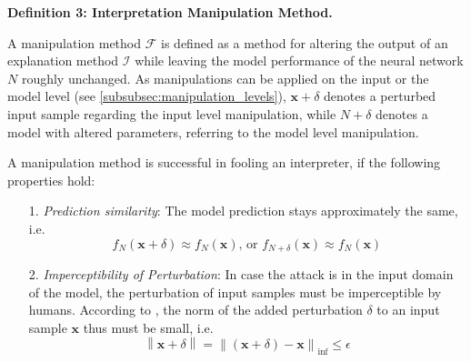 \documentclass[sigconf]{acmart}
\newcommand{\norm}[1]{\left\lVert#1\right\rVert}
\DeclareMathOperator*{\argmax}{arg\,max}
\begin{document}
\par\smallskip
\textbf{Definition 3: Interpretation Manipulation Method.}

\setlength{\leftskip}{0.39cm}
\noindent A manipulation method $\mathcal{F}$ is defined as a method for altering the output of an explanation method $\mathcal{I}$ while leaving the model performance of the neural network $N$ roughly unchanged. 
As manipulations can be applied on the input or the model level (see \autoref{subsubsec:manipulation_levels}), $\mathbf{x}+\delta$ denotes a perturbed input sample regarding the input level manipulation, while $N+\delta$ denotes a model with altered parameters, referring to the model level manipulation.

A manipulation method is successful in fooling an interpreter, if the following properties hold: 
\begin{enumerate}
    \item[1.] \textit{Prediction similarity}: The model prediction stays approximately the same, i.e. $$f_N(\mathbf{x}+\delta) \approx f_N(\mathbf{x}) \text{, or } f_{N+\delta}(\mathbf{x}) \approx f_N(\mathbf{x})$$
    \item[2.] \textit{Imperceptibility of Perturbation}: In case the attack is in the input domain of the model, the perturbation of input samples must be imperceptible by humans. According to \cite{dombrowski2019explanations}, the norm of the added perturbation $\delta$ to an input sample $\mathbf{x}$ thus must be small, i.e. $$\norm{\mathbf{x}+\delta} = \norm{(\mathbf{x}+\delta)-\mathbf{x}}_{\inf} \leq \epsilon$$ %
\end{enumerate}
\setlength{\leftskip}{0cm}
\end{document}
